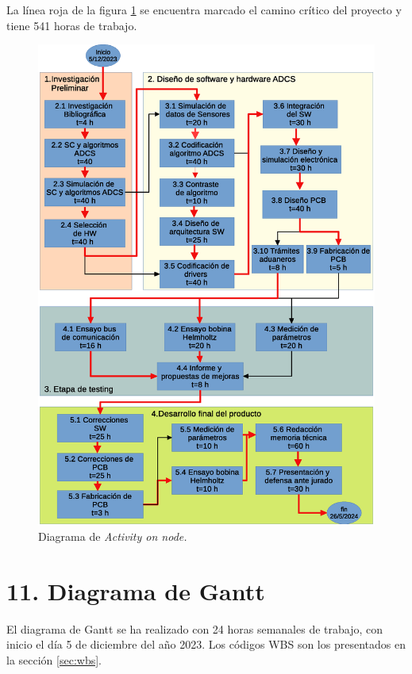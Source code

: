 \documentclass[
11pt, %
]{charter}
\begin{document}
La línea roja de la figura \ref{fig:AoN} se encuentra marcado el camino crítico del proyecto y tiene 541 horas de trabajo. 


\begin{figure}[htpb]
	\centering 
	\includegraphics[width=\linewidth]{Figuras/aoneps.eps}
	\caption{Diagrama de \textit{Activity on node.}}
	\label{fig:AoN}
\end{figure}





\section{11. Diagrama de Gantt}
\label{sec:gantt}
El diagrama de Gantt se ha realizado con 24 horas semanales de trabajo, con inicio el día 5 de diciembre del año 2023. Los códigos WBS son los presentados en la sección \ref{sec:wbs}. 
\end{document}
